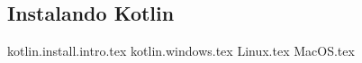 \subsection{Instalando Kotlin}
  {kotlin.install.intro.tex}
  {kotlin.windows.tex}
  {Linux.tex}
  {MacOS.tex}